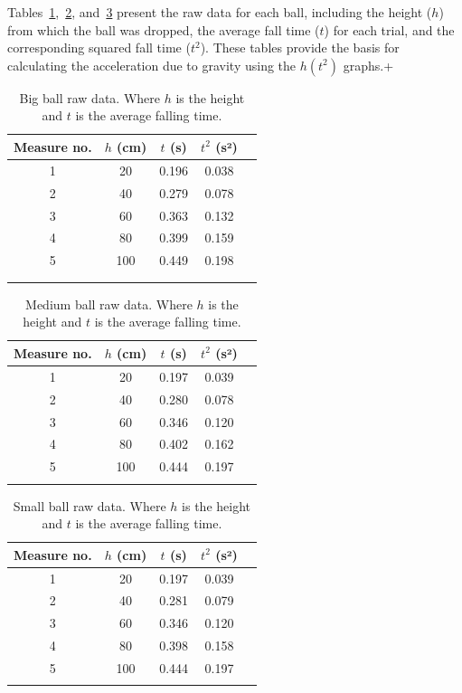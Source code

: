 \documentclass[journal]{IEEEtran}
\begin{document}
Tables~\ref{tab:tab1},~\ref{tab:tab2}, and~\ref{tab:tab3} present the raw data for each ball, including the height ($h$) from which the ball was dropped, the average fall time ($t$) for each trial, and the corresponding squared fall time ($t^2$). These tables provide the basis for calculating the acceleration due to gravity using the $h(t^2)$ graphs.+
\begin{table}[h]
  \centering
  \begin{tabular}{ccccc}
    \hline
    Measure no. & $h$ (cm) & $t$ (s) & $t^2$ (s²) \\
    \hline
    1 & 20 & 0.196 & 0.038 \\
    2 & 40 & 0.279 & 0.078 \\
    3 & 60 & 0.363 & 0.132 \\
    4 & 80 & 0.399 & 0.159 \\
    5 & 100 & 0.449 & 0.198 \\
    \hline\\\textit{}
  \end{tabular}
  \caption{Big ball raw data. Where $h$ is the height and $t$ is the average falling time. }
  \label{tab:tab1}
\end{table}

\begin{table}[h]
  \centering
  \begin{tabular}{ccccc}
    \hline
    Measure no. & $h$ (cm) & $t$ (s) & $t^2$ (s²) \\
    \hline
    1 & 20 & 0.197 & 0.039 \\
    2 & 40 & 0.280 & 0.078 \\
    3 & 60 & 0.346 & 0.120 \\
    4 & 80 & 0.402 & 0.162 \\
    5 & 100 & 0.444 & 0.197 \\
    \hline\\
  \end{tabular}
  \caption{Medium ball raw data. Where $h$ is the height and $t$ is the average falling time. }
  \label{tab:tab2}
\end{table}

\begin{table}[h]
  \centering
  \begin{tabular}{ccccc}
    \hline
    Measure no. & $h$ (cm) & $t$ (s) & $t^2$ (s²) \\
    \hline
    1 & 20 & 0.197 & 0.039 \\
    2 & 40 & 0.281 & 0.079 \\
    3 & 60 & 0.346 & 0.120 \\
    4 & 80 & 0.398 & 0.158 \\
    5 & 100 & 0.444 & 0.197 \\
    \hline\\
  \end{tabular}
  \caption{Small ball raw data. Where $h$ is the height and $t$ is the average falling time. }
  \label{tab:tab3}
\end{table}
\newpage
\end{document}

